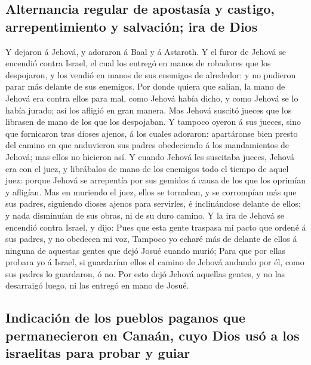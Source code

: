 \hypertarget{alternancia-regular-de-apostasuxeda-y-castigo-arrepentimiento-y-salvaciuxf3n-ira-de-dios}{%
\subsection{Alternancia regular de apostasía y castigo, arrepentimiento
y salvación; ira de
Dios}\label{alternancia-regular-de-apostasuxeda-y-castigo-arrepentimiento-y-salvaciuxf3n-ira-de-dios}}

 Y dejaron á Jehová, y adoraron á Baal y á Astaroth.
 Y el furor de Jehová se encendió contra Israel, el cual
los entregó en manos de robadores que los despojaron, y los vendió en
manos de sus enemigos de alrededor: y no pudieron parar más delante de
sus enemigos.  Por donde quiera que salían, la mano de
Jehová era contra ellos para mal, como Jehová había dicho, y como Jehová
se lo había jurado; así los afligió en gran manera.  Mas
Jehová suscitó jueces que los librasen de mano de los que los
despojaban.  Y tampoco oyeron á sus jueces, sino que
fornicaron tras dioses ajenos, á los cuales adoraron: apartáronse bien
presto del camino en que anduvieron sus padres obedeciendo á los
mandamientos de Jehová; mas ellos no hicieron así.  Y
cuando Jehová les suscitaba jueces, Jehová era con el juez, y librábalos
de mano de los enemigos todo el tiempo de aquel juez: porque Jehová se
arrepentía por sus gemidos á causa de los que los oprimían y afligían.
 Mas en muriendo el juez, ellos se tornaban, y se
corrompían más que sus padres, siguiendo dioses ajenos para servirles, é
inclinándose delante de ellos; y nada disminuían de sus obras, ni de su
duro camino.  Y la ira de Jehová se encendió contra
Israel, y dijo: Pues que esta gente traspasa mi pacto que ordené á sus
padres, y no obedecen mi voz,  Tampoco yo echaré más de
delante de ellos á ninguna de aquestas gentes que dejó Josué cuando
murió;  Para que por ellas probara yo á Israel, si
guardarían ellos el camino de Jehová andando por él, como sus padres lo
guardaron, ó no.  Por esto dejó Jehová aquellas gentes, y
no las desarraigó luego, ni las entregó en mano de Josué.

\hypertarget{indicaciuxf3n-de-los-pueblos-paganos-que-permanecieron-en-canauxe1n-cuyo-dios-usuxf3-a-los-israelitas-para-probar-y-guiar}{%
\subsection{Indicación de los pueblos paganos que permanecieron en
Canaán, cuyo Dios usó a los israelitas para probar y
guiar}\label{indicaciuxf3n-de-los-pueblos-paganos-que-permanecieron-en-canauxe1n-cuyo-dios-usuxf3-a-los-israelitas-para-probar-y-guiar}}


